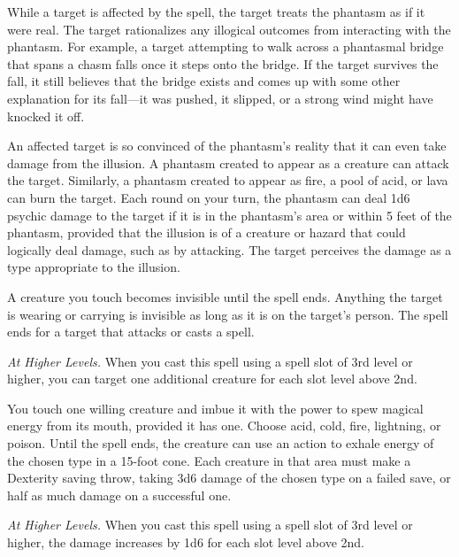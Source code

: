 \documentclass[letterpaper,twocolumn,openany,nodeprecatedcode,justified]{dndbook}
\begin{document}
While a target is affected by the spell, the target treats the phantasm as if it were real. The target rationalizes any illogical outcomes from interacting with the phantasm. For example, a target attempting to walk across a phantasmal bridge that spans a chasm falls once it steps onto the bridge. If the target survives the fall, it still believes that the bridge exists and comes up with some other explanation for its fall---it was pushed, it slipped, or a strong wind might have knocked it off.

An affected target is so convinced of the phantasm's reality that it can even take damage from the illusion. A phantasm created to appear as a creature can attack the target. Similarly, a phantasm created to appear as fire, a pool of acid, or lava can burn the target. Each round on your turn, the phantasm can deal 1d6 psychic damage to the target if it is in the phantasm's area or within 5 feet of the phantasm, provided that the illusion is of a creature or hazard that could logically deal damage, such as by attacking. The target perceives the damage as a type appropriate to the illusion.


A creature you touch becomes invisible until the spell ends. Anything the target is wearing or carrying is invisible as long as it is on the target's person. The spell ends for a target that attacks or casts a spell.

\emph{At Higher Levels.} When you cast this spell using a spell slot of 3rd level or higher, you can target one additional creature for each slot level above 2nd.


You touch one willing creature and imbue it with the power to spew magical energy from its mouth, provided it has one. Choose acid, cold, fire, lightning, or poison. Until the spell ends, the creature can use an action to exhale energy of the chosen type in a 15-foot cone. Each creature in that area must make a Dexterity saving throw, taking 3d6 damage of the chosen type on a failed save, or half as much damage on a successful one.

\emph{At Higher Levels.} When you cast this spell using a spell slot of 3rd level or higher, the damage increases by 1d6 for each slot level above 2nd.
\end{document}
